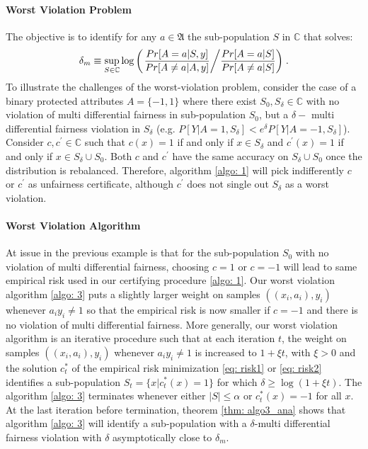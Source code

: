 \documentclass{article}
\begin{document}
\paragraph{Worst Violation Problem}
The objective is to identify for any $a\in \mathfrak{A}$ the sub-population $S$ in $\mathbb{C}$ that solves:
\begin{equation}
\label{eq: wvio}
    \delta_{m} \equiv \sup_{S\in \mathbb{C}}\log\left(\left.\frac{Pr[A=a|S, y]}{Pr[A\neq a|A, y]}\middle/\frac{Pr[A=a|S]}{Pr[A\neq a|S]}\right)\right. .
\end{equation}
To illustrate the challenges of the worst-violation problem, consider the case of a binary protected attributes $A=\{-1, 1\}$ where there exist $S_{0}, S_{\delta}\in \mathbb{C}$  with no violation of multi differential fairness in sub-population $S_{0}$, but a $\delta-$ multi differential fairness violation in $S_{\delta}$ (e.g. $P[Y| A=1, S_{\delta}] < e^{\delta}P[Y| A=-1, S_{\delta}]$).  Consider $c, c^{'}\in \mathbb{C}$ such that $c(x)=1$ if and only if $x\in S_{\delta}$ and $c^{'}(x)=1$ if and only if $x\in S_{\delta}\cup S_{0}$. Both $c$ and $c^{'}$ have the same accuracy on $S_{\delta}\cup S_{0}$ once the distribution is rebalanced. Therefore, algorithm \ref{algo: 1} will pick indifferently $c$ or $c^{'}$ as unfairness certificate, although $c^{'}$ does not single out $S_{\delta}$ as a worst violation. 

\paragraph{Worst Violation Algorithm}
At issue in the previous example is that for the sub-population $S_{0}$  with no violation of multi differential fairness, choosing $c=1$ or $c=-1$ will lead to same empirical risk used in our certifying procedure \ref{algo: 1}. Our worst violation algorithm \ref{algo: 3} puts a slightly larger weight on samples $((x_{i}, a_{i}), y_{i})$ whenever $a_{i}y_{i}\neq 1$ so that the empirical risk is now smaller if $c=-1$ and there is no violation of multi differential fairness.  More generally, our worst violation algorithm is an iterative procedure such that at each iteration $t$, the weight on samples $((x_{i}, a_{i}), y_{i})$ whenever $a_{i}y_{i}\neq 1$ is increased to $1 + \xi t$, with $\xi > 0$ and the solution $c_{t}^{*}$ of the empirical risk minimization \eqref{eq: risk1} or \eqref{eq: risk2} identifies a sub-population $S_{t}=\{x| c_{t}^{*}(x)=1\}$ for which $\delta \geq \log(1 + \xi t)$. The algorithm \ref{algo: 3} terminates whenever either $|S|\leq \alpha$ or $c^{*}_{t}(x)=-1$ for all $x$. At the last iteration before termination, theorem \ref{thm: algo3_ana} shows that algorithm \ref{algo: 3} will identify a sub-population with a $\delta$-multi differential fairness violation with $\delta$ asymptotically close to $\delta_{m}$. 
\end{document}
